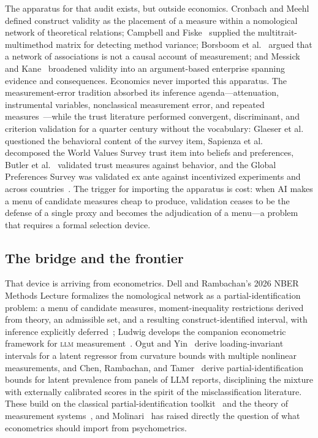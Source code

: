 \documentclass[10pt,letterpaper]{article}
\newcommand{\LLM}{\textsc{llm}}
\begin{document}
The apparatus for that audit exists, but outside economics. Cronbach and Meehl~\cite{cronbach1955} defined construct validity as the placement of a measure within a nomological network of theoretical relations; Campbell and Fiske~\cite{campbell1959} supplied the multitrait-multimethod matrix for detecting method variance; Borsboom et al.~\cite{borsboom2004} argued that a network of associations is not a causal account of measurement; and Messick~\cite{messick1995} and Kane~\cite{kane2013} broadened validity into an argument-based enterprise spanning evidence and consequences. Economics never imported this apparatus. The measurement-error tradition absorbed its inference agenda---attenuation, instrumental variables, nonclassical measurement error, and repeated measures~\cite{hu2008,chen2011,schennach2021}---while the trust literature performed convergent, discriminant, and criterion validation for a quarter century without the vocabulary: Glaeser et al.~\cite{glaeser2000} questioned the behavioral content of the survey item, Sapienza et al.~\cite{sapienza2013} decomposed the World Values Survey trust item into beliefs and preferences, Butler et al.~\cite{butler2016} validated trust measures against behavior, and the Global Preferences Survey was validated ex ante against incentivized experiments and across countries~\cite{falk2018,falk2023}. The trigger for importing the apparatus is cost: when AI makes a menu of candidate measures cheap to produce, validation ceases to be the defense of a single proxy and becomes the adjudication of a menu---a problem that requires a formal selection device.

\subsection{The bridge and the frontier}

That device is arriving from econometrics. Dell and Rambachan's 2026 NBER Methods Lecture formalizes the nomological network as a partial-identification problem: a menu of candidate measures, moment-inequality restrictions derived from theory, an admissible set, and a resulting construct-identified interval, with inference explicitly deferred~\cite{dellrambachan2026}; Ludwig develops the companion econometric framework for \LLM{} measurement~\cite{ludwig2026}. Ogut and Yin~\cite{ogutyin2026} derive loading-invariant intervals for a latent regressor from curvature bounds with multiple nonlinear measurements, and Chen, Rambachan, and Tamer~\cite{chenrambachantamer2026} derive partial-identification bounds for latent prevalence from panels of LLM reports, disciplining the mixture with externally calibrated scores in the spirit of the misclassification literature. These build on the classical partial-identification toolkit~\cite{manski2003} and the theory of measurement systems~\cite{schennach2021}, and Molinari~\cite{molinari2020} has raised directly the question of what econometrics should import from psychometrics.
\end{document}
